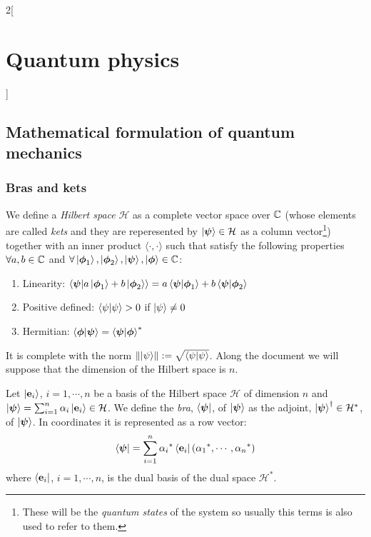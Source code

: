 \documentclass[../../../main_physics.tex]{subfiles}
\begin{document}
\renewcommand{\col}{\phy}
\begin{multicols}{2}[\section{Quantum physics}]
  \subsection{Mathematical formulation of quantum mechanics}
  \subsubsection{Bras and kets}
  \begin{definition}[Ket]
    We define a \emph{Hilbert space} $\mathcal{H}$ as a complete vector space over $\mathbb{C}$ (whose elements are called \emph{kets} and they are reperesented by $\ket{\boldsymbol{\mathrm{\psi}}}\in\mathcal{H}$ as a column vector\footnote{These will be the \emph{quantum states} of the system so usually this terms is also used to refer to them.}) together with an inner product $\langle\cdot,\cdot\rangle$ such that satisfy the following properties $\forall a,b\in\mathbb{C}$ and $\forall \ket{\boldsymbol{\mathrm{\phi}}_1},\ket{\boldsymbol{\mathrm{\phi}}_2},\ket{\boldsymbol{\mathrm{\psi}}},\ket{\boldsymbol{\mathrm{\phi}}}\in \mathbb{C}$:
    \begin{enumerate}
      \item Linearity: $\braket{\boldsymbol{\mathrm{\psi}}}{a\ket{\boldsymbol{\mathrm{\phi}}_1}+b\ket{\boldsymbol{\mathrm{\phi}}_2}}=a\braket{\boldsymbol{\mathrm{\psi}}}{\boldsymbol{\mathrm{\phi}}_1}+b\braket{\boldsymbol{\mathrm{\psi}}}{\boldsymbol{\mathrm{\phi}}_2}$
      \item Positive defined: $\braket{\psi}{\psi}>0$ if $\ket{\psi}\ne 0$
      \item Hermitian: $\braket{\boldsymbol{\mathrm{\phi}}}{\boldsymbol{\mathrm{\psi}}}={\braket{\boldsymbol{\mathrm{\psi}}}{\boldsymbol{\mathrm{\phi}}}}^*$
    \end{enumerate}
    It is complete with the norm $\left\|\ket{\psi}\right\|:=\sqrt{\braket{\psi}{\psi}}$. Along the document we will suppose that the dimension of the Hilbert space is $n$.
  \end{definition}
  \begin{definition}[Bra]
    Let $\ket{\boldsymbol{\mathrm{e}}_i}$, $i=1,\cdots,n$ be a basis of the Hilbert space $\mathcal{H}$ of dimension $n$ and $\ket{\boldsymbol{\mathrm{\psi}}}=\sum_{i=1}^n\alpha_i\ket{\boldsymbol{\mathrm{e}}_i}\in\mathcal{H}$. We define the \emph{bra}, $\bra{\boldsymbol{\mathrm{\psi}}}$, of $\ket{\boldsymbol{\mathrm{\psi}}}$ as the adjoint, ${\ket{\boldsymbol{\mathrm{\psi}}}}^\dag\in\mathcal{H}^*$, of $\ket{\boldsymbol{\mathrm{\psi}}}$. In coordinates it is represented as a row vector:
    $$\bra{\boldsymbol{\mathrm{\psi}}}=\sum_{i=1}^n{\alpha_i}^*\bra{\boldsymbol{\mathrm{e}}_i}({\alpha_1}^*,\cdots,{\alpha_n}^*)$$ where $\bra{\boldsymbol{\mathrm{e}}_i}$, $i=1,\cdots,n$, is the dual basis of the dual space $\mathcal{H}^*$.
  \end{definition}

\end{multicols}
\end{document}
